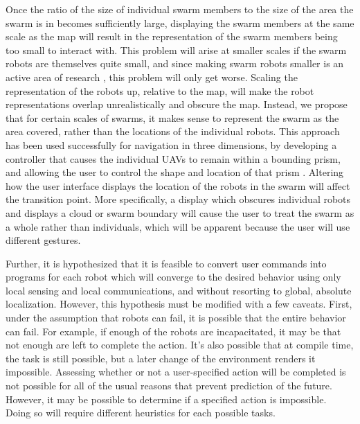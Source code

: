 \documentclass[]{article}
\begin{document}
Once the ratio of the size of individual swarm members to the size of the area the swarm is in becomes sufficiently large, displaying the swarm members at the same scale as the map will result in the representation of the swarm members being too small to interact with. 
This problem will arise at smaller scales if the swarm robots are themselves quite small, and since making swarm robots smaller is an active area of research , this problem will only get worse. 
Scaling the representation of the robots up, relative to the map, will make the robot representations overlap unrealistically and obscure the map. 
Instead, we propose that for certain scales of swarms, it makes sense to represent the swarm as the area covered, rather than the locations of the individual robots.
This approach has been used successfully for navigation in three dimensions, by developing a controller that causes the individual UAVs to remain within a bounding prism, and allowing the user to control the shape and location of that prism \cite{ayanian2014controlling}.
Altering how the user interface displays the location of the robots in the swarm will affect the transition point. 
More specifically, a display which obscures individual robots and displays a cloud or swarm boundary will cause the user to treat the swarm as a whole rather than individuals, which will be apparent because the user will use different gestures. 

Further, it is hypothesized that it is feasible to convert user commands into programs for each robot which will converge to the desired behavior using only local sensing and local communications, and without resorting to global, absolute localization. 
However, this hypothesis must be modified with a few caveats. 
First, under the assumption that robots can fail, it is possible that the entire behavior can fail. 
For example, if enough of the robots are incapacitated, it may be that not enough are left to complete the action. 
It's also possible that at compile time, the task is still possible, but a later change of the environment renders it impossible. 
Assessing whether or not a user-specified action will be completed is not possible for all of the usual reasons that prevent prediction of the future. 
However, it may be possible to determine if a specified action is impossible. 
Doing so will require different heuristics for each possible tasks. 
\end{document}
